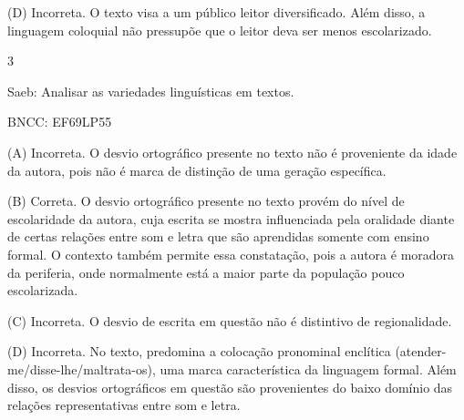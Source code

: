 (D) Incorreta. O texto visa a um público leitor diversificado. Além
disso, a linguagem coloquial não pressupõe que o leitor deva ser menos
escolarizado.

\num{3}

Saeb: Analisar as variedades linguísticas em textos.

BNCC: EF69LP55

(A) Incorreta. O desvio ortográfico presente no texto não é proveniente
da idade da autora, pois não é marca de distinção de uma geração
específica.

(B) Correta. O desvio ortográfico presente no texto provém do nível de
escolaridade da autora, cuja escrita se mostra influenciada pela
oralidade diante de certas relações entre som e letra que são aprendidas
somente com ensino formal. O contexto também permite essa constatação,
pois a autora é moradora da periferia, onde normalmente está a maior
parte da população pouco escolarizada.

(C) Incorreta. O desvio de escrita em questão não é distintivo de
regionalidade.

(D) Incorreta. No texto, predomina a colocação pronominal enclítica
(atender-me/disse-lhe/maltrata-os), uma marca característica da
linguagem formal. Além disso, os desvios ortográficos em questão são
provenientes do baixo domínio das relações representativas entre som e
letra.


